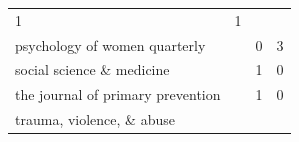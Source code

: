 \documentclass[]{tufte-handout}
\begin{document}
\begin{longtable}[]{@{}llll@{}}
\begin{minipage}[t]{0.06\columnwidth}
1\strut
\end{minipage} & \begin{minipage}[t]{0.06\columnwidth}\raggedright\strut
1\strut
\end{minipage}\tabularnewline
\begin{minipage}[t]{0.63\columnwidth}\raggedright\strut
psychology of women quarterly\strut
\end{minipage} & \begin{minipage}[t]{0.04\columnwidth}\raggedright\strut
\strut
\end{minipage} & \begin{minipage}[t]{0.06\columnwidth}\raggedright\strut
0\strut
\end{minipage} & \begin{minipage}[t]{0.06\columnwidth}\raggedright\strut
3\strut
\end{minipage}\tabularnewline
\begin{minipage}[t]{0.63\columnwidth}\raggedright\strut
social science \& medicine\strut
\end{minipage} & \begin{minipage}[t]{0.04\columnwidth}\raggedright\strut
\strut
\end{minipage} & \begin{minipage}[t]{0.06\columnwidth}\raggedright\strut
1\strut
\end{minipage} & \begin{minipage}[t]{0.06\columnwidth}\raggedright\strut
0\strut
\end{minipage}\tabularnewline
\begin{minipage}[t]{0.63\columnwidth}\raggedright\strut
the journal of primary prevention\strut
\end{minipage} & \begin{minipage}[t]{0.04\columnwidth}\raggedright\strut
\strut
\end{minipage} & \begin{minipage}[t]{0.06\columnwidth}\raggedright\strut
1\strut
\end{minipage} & \begin{minipage}[t]{0.06\columnwidth}\raggedright\strut
0\strut
\end{minipage}\tabularnewline
\begin{minipage}[t]{0.63\columnwidth}\raggedright\strut
trauma, violence, \& abuse\strut
\end{minipage} & \begin{minipage}[t]{0.04\columnwidth}\raggedright\strut
\strut
\end{minipage} & \begin{minipage}[t]{0.06\columnwidth}\raggedright\strut

\end{minipage}
\end{longtable}
\end{document}
